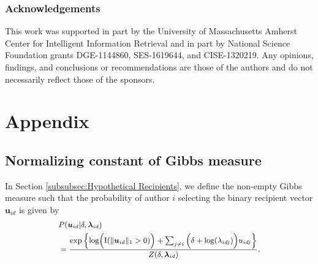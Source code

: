 \documentclass[twoside]{article}
\begin{document}
\subsubsection*{Acknowledgements}
This work was supported in part by the University of Massachusetts Amherst Center for Intelligent Information Retrieval and in part by National Science Foundation grants DGE-1144860, SES-1619644, and CISE-1320219. Any opinions, findings, and conclusions or recommendations are those of the authors and do not necessarily reflect those of the sponsors.


\newpage
\appendix
\section*{Appendix}
\renewcommand{\thesubsection}{\Alph{subsection}}
  	 \subsection{Normalizing constant of Gibbs measure}\label{subsec: non-empty Gibbs measure}
  	 In Section \ref{subsubsec:Hypothetical Recipients}, we define the non-empty Gibbs measure such that the probability of author $i$ selecting the binary recipient vector $\boldsymbol{u}_{id}$ is given by
  	 \begin{equation*} 
  	 \footnotesize
  	 \begin{aligned}
  	& P(\boldsymbol{u}_{id}| \delta, \boldsymbol{\lambda}_{id} ) \\&= \frac{\exp\Big\{ \mbox{log}\Big(\text{I}(\lVert \boldsymbol{u}_{id} \rVert_1 > 0)\Big) + \sum_{j \neq i} \Big(\delta+\mbox{log}(\lambda_{idj})\Big)u_{idj} \Big\}}{Z(\delta,\boldsymbol{\lambda}_{id})}.
  	 \end{aligned}
  	 \end{equation*}
  	 
\end{document}
